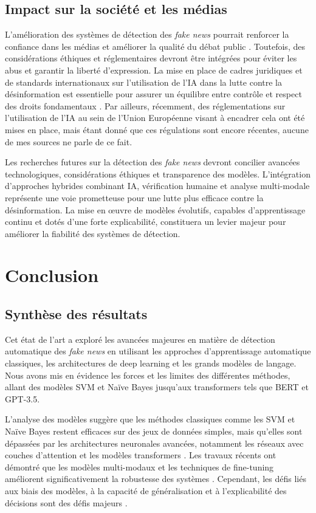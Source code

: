 \documentclass[a4paper,12pt, twocolumn]{article}
\begin{document}
\begin{twocolumn}
\subsection{Impact sur la société et les médias}
L’amélioration des systèmes de détection des \textit{fake news} pourrait renforcer la confiance dans les médias et améliorer la qualité du débat public \cite{roumeliotis_fake_2025}. Toutefois, des considérations éthiques et réglementaires devront être intégrées pour éviter les abus et garantir la liberté d’expression. La mise en place de cadres juridiques et de standards internationaux sur l’utilisation de l’IA dans la lutte contre la désinformation est essentielle pour assurer un équilibre entre contrôle et respect des droits fondamentaux \cite{yang_unsupervised_2019}. 
Par ailleurs, récemment, des réglementations sur l'utilisation de l'IA au sein de l'Union Européenne visant à encadrer cela ont été mises en place, mais étant donné que ces régulations sont encore récentes, aucune de mes sources ne parle de ce fait.

\bigskip
Les recherches futures sur la détection des \textit{fake news} devront concilier avancées technologiques, considérations éthiques et transparence des modèles. L’intégration d’approches hybrides combinant IA, vérification humaine et analyse multi-modale représente une voie prometteuse pour une lutte plus efficace contre la désinformation. La mise en œuvre de modèles évolutifs, capables d’apprentissage continu et dotés d’une forte explicabilité, constituera un levier majeur pour améliorer la fiabilité des systèmes de détection.


\section{Conclusion}
\label{chap:conclusion}

\subsection{Synthèse des résultats}
Cet état de l’art a exploré les avancées majeures en matière de détection automatique des \textit{fake news} en utilisant les approches d’apprentissage automatique classiques, les architectures de deep learning et les grands modèles de langage. Nous avons mis en évidence les forces et les limites des différentes méthodes, allant des modèles SVM et Naïve Bayes jusqu’aux transformers tels que BERT et GPT-3.5.

L’analyse des modèles suggère que les méthodes classiques comme les SVM et Naïve Bayes restent efficaces sur des jeux de données simples, mais qu’elles sont dépassées par les architectures neuronales avancées, notamment les réseaux avec couches d'attention et les modèles transformers \cite{conroy_automatic_2015, singhania_3han_2017}. Les travaux récents ont démontré que les modèles multi-modaux et les techniques de fine-tuning améliorent significativement la robustesse des systèmes \cite{verma_welfake_2021, alghamdi_towards_2023}. Cependant, les défis liés aux biais des modèles, à la capacité de généralisation et à l’explicabilité des décisions sont des défis majeurs \cite{kaliyar_fakebert_2021, hu_bad_2024}.


\end{twocolumn}
\end{document}
